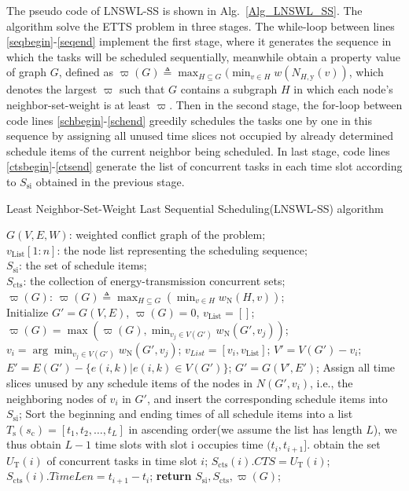 \documentclass[journal,10pt]{IEEEtran}
\begin{document}
The pseudo code of LNSWL-SS is shown in Alg.~\ref{Alg_LNSWL_SS}. The algorithm solve the ETTS problem in three stages. The while-loop between lines \ref{seqbegin}-\ref{seqend} implement the first stage, where it generates the sequence in which the tasks will be scheduled sequentially, meanwhile obtain a property value of graph $G$, defined as $\varpi(G){\triangleq}\max_{H{\subseteq}G}(\min_{v{\in}H}w(N_{H,\text{y}}(v))$, which denotes the largest $\varpi$ such that $G$ contains a subgraph $H$ in which each node's neighbor-set-weight is at least $\varpi$. Then in the second stage, the for-loop between code lines \ref{schbegin}-\ref{schend} greedily schedules the tasks one by one in this sequence by assigning all unused time slices not occupied by already determined schedule items of the current neighbor being scheduled. In last stage, code lines \ref{ctsbegin}-\ref{ctsend} generate the list of concurrent tasks in each time slot according to $S_\text{si}$ obtained in the previous stage.

\begin{algorithm}[!htb]
\caption{Least Neighbor-Set-Weight Last Sequential Scheduling(LNSWL-SS) algorithm}
\begin{algorithmic}[1]\label{Alg_LNSWL_SS}
    \REQUIRE $G(V,E,W)$: weighted conflict graph of the problem;\\
    \ENSURE $v_\text{List}[1{:}n]$: the node list representing the scheduling sequence;\\
    $S_\text{si}$: the set of schedule items;\\
    $S_\text{cts}$: the collection of energy-transmission concurrent sets;\\
    $\varpi(G)$: $\varpi(G){\triangleq}\max_{H{\subseteq}G}(\min_{v{\in}H}w_\text{N}(H,v))$; \\
    \STATE Initialize $G'{=}G(V,E)$, $\varpi(G){=}0$, $v_\text{List}{=}[]$;
    \label{seqbegin}
        \STATE $\varpi(G){=}\max(\varpi(G),\min_{v_j{\in}V(G')}w_\text{N}(G',v_j))$;\label{v_update}
        \STATE $v_i{=}\arg\min_{v_j{\in}V(G')}w_\text{N}(G',v_j)$;
        \STATE $v_{List}=[v_i,v_\text{List}]$;
        \STATE $V'{=}V(G'){-}v_i$; $E'{=}E(G'){-}\{e(i,k)|e(i,k){\in}V(G')\}$;
        \STATE $G'{=}G(V',E')$;
    \ENDWHILE \label{seqend}
     \label{schbegin}
        \STATE Assign all time slices unused by any schedule items of the nodes in $N(G',v_i)$, i.e., the neighboring nodes of $v_i$ in $G'$, and insert the corresponding schedule items into $S_\text{si}$;
    \ENDFOR \label{schend}
    \STATE Sort the beginning and ending times of all schedule items into a list $T_\text{s}(s_\text{c}){=}[t_1,t_2,\ldots,t_{L}]$ in ascending order(we assume the list has length $L$), we thus obtain $L{-}1$ time slots with slot i occupies time $(t_{i},t_{i{+}1}]$.\label{ctsbegin}
        \STATE obtain the set $U_\text{T}(i)$ of concurrent tasks in time slot $i$;
        \STATE $S_\text{cts}(i).CTS{=}U_\text{T}(i)$;$S_\text{cts}(i).TimeLen{=}t_{i{+}1}{-}t_{i}$;
    \ENDFOR \label{ctsend}
    \STATE \textbf{return} $S_\text{si}, S_\text{cts}, \varpi(G)$;
\end{algorithmic}
\end{algorithm}
\end{document}
